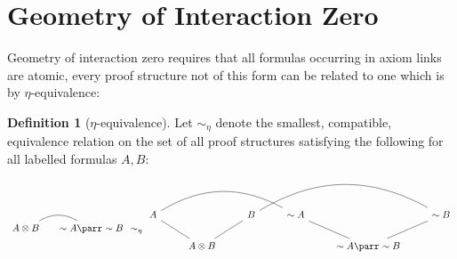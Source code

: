 \documentclass[12pt]{article}
\theoremstyle{plain}
\theoremstyle{definition}
\newtheorem{defn}[thm]{Definition} %
\newcommand{\negation}{\sim}
\begin{document}
	\section{Geometry of Interaction Zero}
	Geometry of interaction zero requires that all formulas occurring in axiom links are atomic, every proof structure not of this form can be related to one which is by $\eta$-equivalence:
	\begin{defn}[$\eta$-equivalence]
		Let $\sim_{\eta}$ denote the smallest, compatible, equivalence relation on the set of all proof structures satisfying the following for all labelled formulas $A,B$:
		\begin{equation}
			\begin{tikzcd}[column sep = small]
				A\otimes B \arrow[r,dash, bend left] & \negation A \parr \negation B
			\end{tikzcd}
			\sim_{\eta}
			\begin{tikzcd}
				A\arrow[rrr,bend left, dash]\arrow[dr,dash] & & B\arrow[rrr,dash,bend left]\arrow[dl,dash] & \negation A\arrow[dr,dash] & & \negation B\arrow[dl,dash]\\
				& A \otimes B & & & \negation A \parr \negation B
			\end{tikzcd}
		\end{equation}
	\end{defn}
	
	
	
\end{document}
